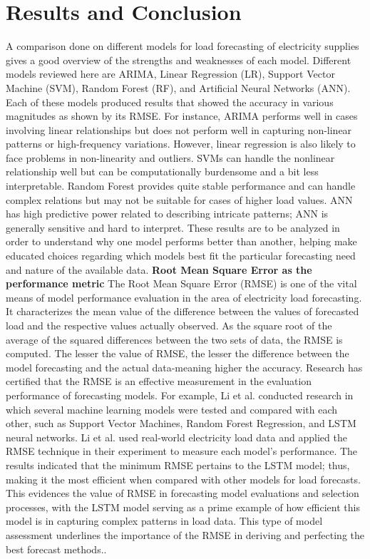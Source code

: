 \documentclass[12pt, a4paper,twoside]{report}
\theoremstyle{plain} %
\theoremstyle{definition} %
\theoremstyle{remark} %
\numberwithin{equation}{chapter}
\begin{document}
\chapter{Results and Conclusion}\label{ch:5}
A comparison done on different models for load forecasting of electricity supplies gives a good overview of the strengths and weaknesses of each model. Different models reviewed here are ARIMA, Linear Regression (LR), Support Vector Machine (SVM), Random Forest (RF), and Artificial Neural Networks (ANN). Each of these models produced results that showed the accuracy in various magnitudes as shown by its RMSE. For instance, ARIMA performs well in cases involving linear relationships but does not perform well in capturing non-linear patterns or high-frequency variations. However, linear regression is also likely to face problems in non-linearity and outliers. SVMs can handle the nonlinear relationship well but can be computationally burdensome and a bit less interpretable. Random Forest provides quite stable performance and can handle complex relations but may not be suitable for cases of higher load values. ANN has high predictive power related to describing intricate patterns; ANN is generally sensitive and hard to interpret. These results are to be analyzed in order to understand why one model performs better than another, helping make educated choices regarding which models best fit the particular forecasting need and nature of the available data.
\newline
\newline
\textbf{Root Mean Square Error as the performance metric}
\newline
The Root Mean Square Error (RMSE) is one of the vital means of model performance evaluation in the area of electricity load forecasting. It characterizes the mean value of the difference between the values of forecasted load and the respective values actually observed. As the square root of the average of the squared differences between the two sets of data, the RMSE is computed. The lesser the value of RMSE, the lesser the difference between the model forecasting and the actual data-meaning higher the accuracy.
Research has certified that the RMSE is an effective measurement in the evaluation performance of forecasting models. For example, Li et al. conducted research in which several machine learning models were tested and compared with each other, such as Support Vector Machines, Random Forest Regression, and LSTM neural networks. Li et al. used real-world electricity load data and applied the RMSE technique in their experiment to measure each model's performance. The results indicated that the minimum RMSE pertains to the LSTM model; thus, making it the most efficient when compared with other models for load forecasts. This evidences the value of RMSE in forecasting model evaluations and selection processes, with the LSTM model serving as a prime example of how efficient this model is in capturing complex patterns in load data. This type of model assessment underlines the importance of the RMSE in deriving and perfecting the best forecast methods.\cite{li2020novel}.
\end{document}
